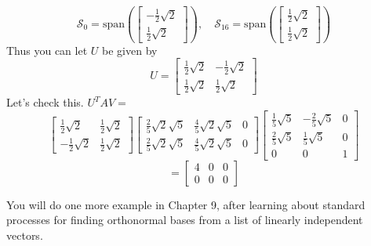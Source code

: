 \documentclass{ximera}
\begin{document}
\begin{example}
\begin{explanation}
\begin{equation*}
\mathcal{S}_0=\mbox{span}\left(\left[ 
\begin{array}{c}
-\frac{1}{2}\sqrt{2} \\
\frac{1}{2}\sqrt{2}
\end{array}
\right] \right),\quad\mathcal{S}_{16}=\mbox{span}\left( \left[ 
\begin{array}{c}
\frac{1}{2}\sqrt{2} \\
\frac{1}{2}\sqrt{2}
\end{array}
\right] \right)
\end{equation*}
Thus you can let $U$ be given by
\begin{equation*}
U=\left[ 
\begin{array}{cc}
\frac{1}{2}\sqrt{2} & -\frac{1}{2}\sqrt{2} \\
\frac{1}{2}\sqrt{2} & \frac{1}{2}\sqrt{2}
\end{array}
\right]
\end{equation*}
Let's check this. $U^TAV=$
\begin{equation*}
\left[ 
\begin{array}{cc}
\frac{1}{2}\sqrt{2} & \frac{1}{2}\sqrt{2} \\
-\frac{1}{2}\sqrt{2} & \frac{1}{2}\sqrt{2}
\end{array}
\right] \left[  
\begin{array}{ccc}
\frac{2}{5}\sqrt{2}\sqrt{5} & \frac{4}{5}\sqrt{2}\sqrt{5} & 0 \\
\frac{2}{5}\sqrt{2}\sqrt{5} & \frac{4}{5}\sqrt{2}\sqrt{5} & 0
\end{array}
\right] \left[
\begin{array}{ccc}
\frac{1}{5}\sqrt{5} & -\frac{2}{5}\sqrt{5} & 0 \\
\frac{2}{5}\sqrt{5} & \frac{1}{5}\sqrt{5} & 0 \\
0 & 0 & 1
\end{array}
\right]
\end{equation*}
\begin{equation*}
=\left[
\begin{array}{ccc}
4 & 0 & 0 \\
0 & 0 & 0
\end{array}
\right]
\end{equation*}
\end{explanation}
\end{example}
 
 You will do one more example in Chapter 9, after learning about standard processes for finding orthonormal bases from a list of linearly independent vectors. 
\end{document}
